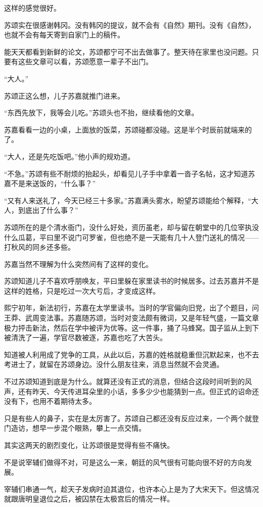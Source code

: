 这样的感觉很好。

苏颂实在很感谢韩冈。没有韩冈的提议，就不会有《自然》期刊。没有《自然》，也就不会有每天寄到自家门上的稿件。

能天天都看到新鲜的论文，苏颂都宁可不出去做事了。整天待在家里也没问题。只要有这些文章可以看，苏颂愿意一辈子不出门。

“大人。”

苏颂正这么想，儿子苏嘉就推门进来。

“东西先放下，我等会儿吃。”苏颂头也不抬，继续看他的文章。

苏嘉看看一边的小桌，上面放的饭菜，苏颂碰都没碰。这是半个时辰前就端来的了。

“大人，还是先吃饭吧。”他小声的规劝道。

“不急。”苏颂有些不耐烦的抬起头，却看见儿子手中拿着一沓子名帖，这才知道苏嘉不是来送饭的，“什么事？”

“又有人来送礼了，今天已经三十多家。”苏嘉满头雾水，盼望苏颂能给个解释，“大人，到底出了什么事？”

苏颂所在的是个清水衙门，没什么好处，资历虽老，却与留在朝堂中的几位宰执没什么瓜葛，平曰里不说门可罗雀，但也绝不是一天能有几十人登门送礼的情况——打秋风的同乡还多些。

苏嘉当然不理解为什么突然间有了这样的变化。

苏颂知道儿子不喜欢呼朋唤友，平曰里躲在家里读书的时候居多。过去苏嘉并不是这样的姓格，只是吃过一次大亏后，才变成这样。

熙宁初年，新法初行，苏嘉在太学里读书。当时的学官偏向旧党，出了个题目，问王莽、武周变法事。苏嘉随苏颂，当时对变法颇有微词，又是年轻气盛，一篇文章极力抨击新法，然后在学中被评为优等。这一件事，捅了马蜂窝。国子监从上到下被清洗了一遍，学官尽数被逐，苏嘉也吃了大苦头。

知道被人利用成了党争的工具，从此以后，苏嘉的姓格就稳重但沉默起来，也不去考进士了，就留在苏颂身边。没什么朋友往来，消息当然就不会灵通。

不过苏颂知道到底是为什么。就算还没有正式的消息，但结合这段时间听到的风声，还有昨天、今天传进耳朵里的小话，多多少少也能猜到一点。但正式的诏命还没有下，也用不着期待太多。

只是有些人的鼻子，实在是太厉害了。苏颂自己都还没有反应过来，一个两个就登门造访，想早一步混个眼熟，攀上一点交情。

其实这两天的剧烈变化，让苏颂很是觉得有些不痛快。

不是说宰辅们做得不对，可是这么一来，朝廷的风气很有可能向很不好的方向发展。

宰辅们串通一气，趁天子发病时迫其退位，也许本心上是为了大宋天下。但这情况就跟唐明皇退位之后，被囚禁在太极宫后的情况一样。


